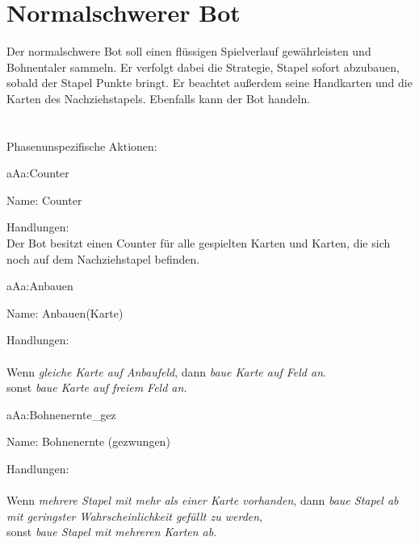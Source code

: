 \section{Normalschwerer Bot}

Der normalschwere Bot soll einen flüssigen Spielverlauf gewährleisten und Bohnentaler sammeln. Er verfolgt dabei die Strategie, Stapel sofort abzubauen, sobald der Stapel Punkte bringt. Er beachtet außerdem seine Handkarten und die Karten des Nachziehstapels. Ebenfalls kann der Bot handeln. \\
\\ 

\hfill\\ Phasenunspezifische Aktionen:\\


\begin{description}[leftmargin=5em, style=sameline]
	
	\begin{lhp}{a}{A}{a:Counter}
		\item [Name:] Counter
		\item [Handlungen:]\hfill\\ 
		Der Bot besitzt einen Counter für alle gespielten Karten und Karten, die sich noch auf dem Nachziehstapel befinden.
		
	\end{lhp}
	
	\begin{lhp}{a}{A}{a:Anbauen}
		\item [Name:] Anbauen(Karte)
		\item [Handlungen:]\hfill\\ 
		\\Wenn {\itshape gleiche Karte auf Anbaufeld}, dann 
		{\itshape baue Karte auf Feld an}.\\
		sonst {\itshape baue Karte auf freiem Feld an}.
		
	\end{lhp}
	
	\begin{lhp}{a}{A}{a:Bohnenernte_gez}
		\item [Name:] Bohnenernte (gezwungen)
		\item [Handlungen:]\hfill\\ 
		\\Wenn {\itshape mehrere Stapel mit mehr als einer Karte vorhanden}, dann 
		{\itshape baue Stapel ab mit geringster Wahrscheinlichkeit gefüllt zu werden},\\
		sonst {\itshape baue Stapel mit mehreren Karten ab}.
	\end{lhp}


\end{description}
